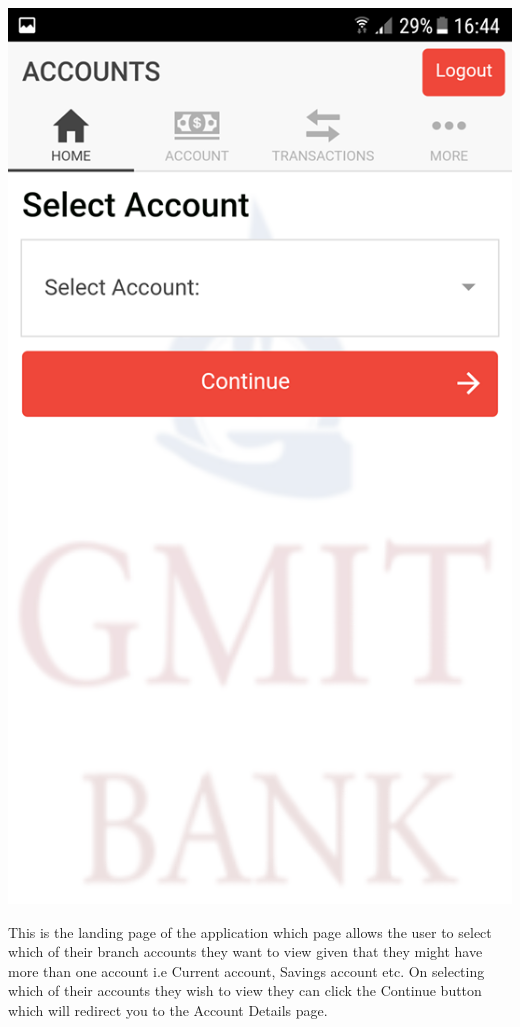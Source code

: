 \begin{center}
    \includegraphics[scale=0.5]{img/5homepageempty.png}
\end{center}
 This is the landing page of the application which page allows the user to select which of their branch accounts they want to view given that they might have more than one account i.e Current account, Savings account etc. On selecting which of their accounts they wish to view they can click the Continue button which will redirect you to the Account Details page.\paragraph{}


